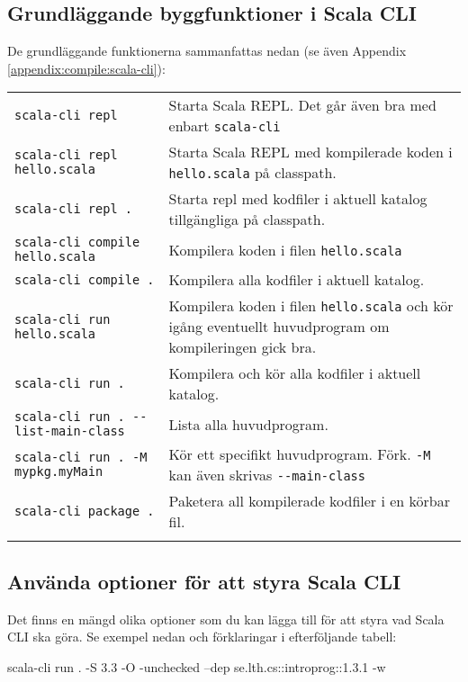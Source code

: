 \subsection{Grundläggande byggfunktioner i Scala CLI}

De grundläggande funktionerna sammanfattas nedan (se även Appendix \ref{appendix:compile:scala-cli}):

\begin{table}[H]
\begin{tabular}{l p{6.5cm}}
\texttt{scala-cli repl} & Starta Scala REPL.  Det går även bra med enbart \texttt{scala-cli}\\
\texttt{scala-cli repl hello.scala} & Starta Scala REPL med kompilerade koden i \texttt{hello.scala} på classpath.  \\
\texttt{scala-cli repl .} & Starta repl med kodfiler i aktuell katalog tillgängliga på classpath. \\
\texttt{scala-cli compile hello.scala} & Kompilera koden i filen \texttt{hello.scala}  \\
\texttt{scala-cli compile .} & Kompilera alla kodfiler i aktuell katalog. \\
\texttt{scala-cli run hello.scala} & Kompilera koden i filen \texttt{hello.scala} och kör igång eventuellt huvudprogram om kompileringen gick bra. \\
\texttt{scala-cli run .} & Kompilera och kör alla kodfiler i aktuell katalog. \\
\texttt{scala-cli run . -{}-list-main-class} & Lista alla huvudprogram. \\
\texttt{scala-cli run . -M mypkg.myMain} & Kör ett specifikt huvudprogram. Förk. \texttt{-M} kan även skrivas \texttt{-{}-main-class}\\
\texttt{scala-cli package .} & Paketera all kompilerade kodfiler i en körbar fil. \\
\\
\end{tabular}
\end{table}

\subsection{Använda optioner för att styra Scala CLI}

\noindent Det finns en mängd olika optioner som du kan lägga till för att styra vad Scala CLI ska göra. Se exempel nedan och förklaringar i efterföljande tabell:
\begin{REPLsmall}
scala-cli run . -S 3.3 -O -unchecked --dep se.lth.cs::introprog::1.3.1 -w
\end{REPLsmall}

